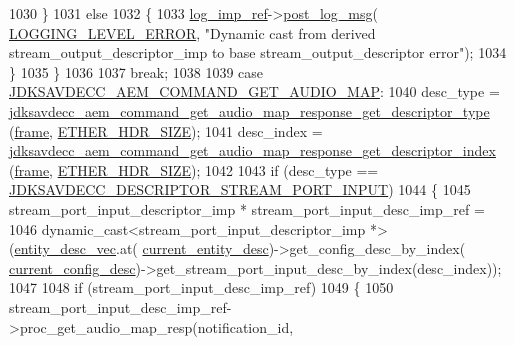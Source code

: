 \begin{DoxyCode}
{{1030             \}
1031             \textcolor{keywordflow}{else}
1032             \{
1033                 \hyperlink{namespaceavdecc__lib_acbe3e2a96ae6524943ca532c87a28529}{log\_imp\_ref}->\hyperlink{classavdecc__lib_1_1log_a68139a6297697e4ccebf36ccfd02e44a}{post\_log\_msg}(
      \hyperlink{namespaceavdecc__lib_a501055c431e6872ef46f252ad13f85cdaf2c4481208273451a6f5c7bb9770ec8a}{LOGGING\_LEVEL\_ERROR}, \textcolor{stringliteral}{"Dynamic cast from derived stream\_output\_descriptor\_imp to base
       stream\_output\_descriptor error"});
1034             \}
1035         \}
1036 
1037         \textcolor{keywordflow}{break};
1038 
1039     \textcolor{keywordflow}{case} \hyperlink{group__command_ga5d806d56b7dfd0104e5e127c910dbb65}{JDKSAVDECC\_AEM\_COMMAND\_GET\_AUDIO\_MAP}:
1040         desc\_type = 
      \hyperlink{group__command__get__audio__map__response_gadad3ed6c46e1496f7d1b519166e81425}{jdksavdecc\_aem\_command\_get\_audio\_map\_response\_get\_descriptor\_type}
      (\hyperlink{gst__avb__playbin_8c_ac8e710e0b5e994c0545d75d69868c6f0}{frame}, \hyperlink{namespaceavdecc__lib_a6c827b1a0d973e18119c5e3da518e65ca9512ad9b34302ba7048d88197e0a2dc0}{ETHER\_HDR\_SIZE});
1041         desc\_index = 
      \hyperlink{group__command__get__audio__map__response_ga59110138100c2d8b54c2bb035604d6a2}{jdksavdecc\_aem\_command\_get\_audio\_map\_response\_get\_descriptor\_index}
      (\hyperlink{gst__avb__playbin_8c_ac8e710e0b5e994c0545d75d69868c6f0}{frame}, \hyperlink{namespaceavdecc__lib_a6c827b1a0d973e18119c5e3da518e65ca9512ad9b34302ba7048d88197e0a2dc0}{ETHER\_HDR\_SIZE});
1042 
1043         \textcolor{keywordflow}{if} (desc\_type == \hyperlink{group__descriptor_gabf97c9389e49a8c27f2192854f830eda}{JDKSAVDECC\_DESCRIPTOR\_STREAM\_PORT\_INPUT})
1044         \{
1045             stream\_port\_input\_descriptor\_imp * stream\_port\_input\_desc\_imp\_ref =
1046                 \textcolor{keyword}{dynamic\_cast<}stream\_port\_input\_descriptor\_imp *\textcolor{keyword}{>}(\hyperlink{classavdecc__lib_1_1end__station__imp_a72edab41bc56e3c1757944a7df188a3d}{entity\_desc\_vec}.at(
      \hyperlink{classavdecc__lib_1_1end__station__imp_afd78c89df26ba7641e1adb764c0e827d}{current\_entity\_desc})->get\_config\_desc\_by\_index(
      \hyperlink{classavdecc__lib_1_1end__station__imp_a60b1af40d35e8a86b0082c54ab6cb6a8}{current\_config\_desc})->get\_stream\_port\_input\_desc\_by\_index(desc\_index));
1047 
1048             \textcolor{keywordflow}{if} (stream\_port\_input\_desc\_imp\_ref)
1049             \{
1050                 stream\_port\_input\_desc\_imp\_ref->proc\_get\_audio\_map\_resp(notification\_id, 
}}
\end{DoxyCode}
